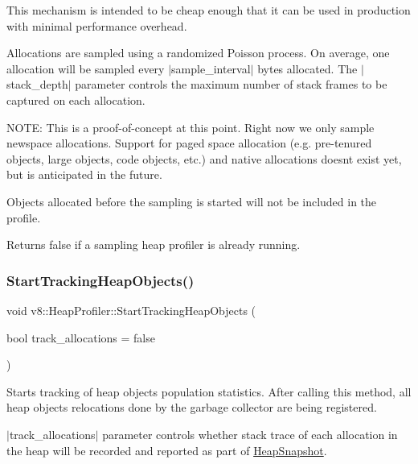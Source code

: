 This mechanism is intended to be cheap enough that it can be used in production with minimal performance overhead.

Allocations are sampled using a randomized Poisson process. On average, one allocation will be sampled every $\vert$sample\+\_\+interval$\vert$ bytes allocated. The $\vert$stack\+\_\+depth$\vert$ parameter controls the maximum number of stack frames to be captured on each allocation.

N\+O\+TE\+: This is a proof-\/of-\/concept at this point. Right now we only sample newspace allocations. Support for paged space allocation (e.\+g. pre-\/tenured objects, large objects, code objects, etc.) and native allocations doesn\textquotesingle{}t exist yet, but is anticipated in the future.

Objects allocated before the sampling is started will not be included in the profile.

Returns false if a sampling heap profiler is already running. \mbox{\label{classv8_1_1HeapProfiler_a02917db133b7efd468c9c73075a15171}} 
\subsubsection{\texorpdfstring{Start\+Tracking\+Heap\+Objects()}{StartTrackingHeapObjects()}}
{\footnotesize\ttfamily void v8\+::\+Heap\+Profiler\+::\+Start\+Tracking\+Heap\+Objects (\begin{DoxyParamCaption}\item[{bool}]{track\+\_\+allocations = {\ttfamily false} }\end{DoxyParamCaption})}

Starts tracking of heap objects population statistics. After calling this method, all heap objects relocations done by the garbage collector are being registered.

$\vert$track\+\_\+allocations$\vert$ parameter controls whether stack trace of each allocation in the heap will be recorded and reported as part of \mbox{\hyperlink{classv8_1_1HeapSnapshot}{Heap\+Snapshot}}. \mbox{\label{classv8_1_1HeapProfiler_abc43e12e6febb087be251c0629ff17bf}} 
